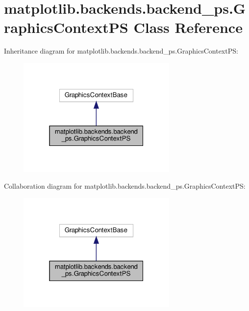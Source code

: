 \hypertarget{classmatplotlib_1_1backends_1_1backend__ps_1_1GraphicsContextPS}{}\section{matplotlib.\+backends.\+backend\+\_\+ps.\+Graphics\+Context\+PS Class Reference}
\label{classmatplotlib_1_1backends_1_1backend__ps_1_1GraphicsContextPS}


Inheritance diagram for matplotlib.\+backends.\+backend\+\_\+ps.\+Graphics\+Context\+PS\+:
\nopagebreak
\begin{figure}[H]
\begin{center}
\leavevmode
\includegraphics[width=223pt]{classmatplotlib_1_1backends_1_1backend__ps_1_1GraphicsContextPS__inherit__graph}
\end{center}
\end{figure}


Collaboration diagram for matplotlib.\+backends.\+backend\+\_\+ps.\+Graphics\+Context\+PS\+:
\nopagebreak
\begin{figure}[H]
\begin{center}
\leavevmode
\includegraphics[width=223pt]{classmatplotlib_1_1backends_1_1backend__ps_1_1GraphicsContextPS__coll__graph}
\end{center}
\end{figure}
